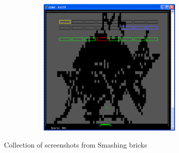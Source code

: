 \begin{figure}
\begin{subfigure}[b]{\columnwidth}
\begin{subfigure}{0.3\linewidth}
		\end{subfigure}
		\begin{subfigure}{0.3\linewidth}
			\includegraphics[scale=0.3]{pictures/level_5.PNG}
		\end{subfigure}
	\end{subfigure}
	\caption{Collection of screenshots from Smashing bricks}
	\label{screenshots}
\end{figure}
